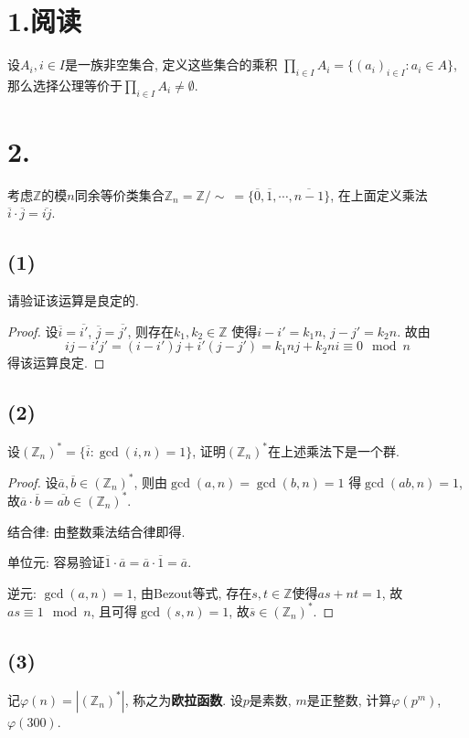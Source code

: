 \documentclass[12pt, a4paper, fontset=windows]{ctexart}
\newcommand{\Z}{\mathbb{Z}}
\newcommand{\abs}[1]{\left|{#1}\right|}
\newcommand{\cl}[1]{\overline{#1}} %
\newcommand{\yuedu}{{\normalsize 阅读}}
\begin{document}
\section*{1.\yuedu}

设$A_i,i\in I$是一族非空集合, 定义这些集合的乘积
$\prod_{i\in I}A_i=\{(a_i)_{i\in I}:a_i\in A\}$, 
那么选择公理等价于$\prod_{i\in I}A_i\ne\emptyset$. 

\section*{2.}

考虑$\Z$的模$n$同余等价类集合$\Z_n=\Z/\sim\ =\{\cl{0},\cl{1},\cdots,\cl{n-1}\}$, 
在上面定义乘法$\cl{i}\cdot\cl{j}=\cl{ij}$. 

\subsection*{(1)}

请验证该运算是良定的. 

\begin{proof}
设$\cl{i}=\cl{i'}$, $\cl{j}=\cl{j'}$, 则存在$k_1,k_2\in\Z$
使得$i-i'=k_1n$, $j-j'=k_2n$. 故由
\[ij-i'j'=(i-i')j+i'(j-j')=k_1nj+k_2ni\equiv 0\mod{n}\]
得该运算良定. 
\end{proof}

\subsection*{(2)}

设$(\Z_n)^*=\{\cl{i}:\gcd(i,n)=1\}$, 
证明$(\Z_n)^*$在上述乘法下是一个群. 

\begin{proof}
设$\cl{a},\cl{b}\in(\Z_n)^*$, 则由$\gcd(a,n)=\gcd(b,n)=1$
得$\gcd(ab,n)=1$, 故$\cl{a}\cdot\cl{b}=\cl{ab}\in(\Z_n)^*$. 

结合律: 
由整数乘法结合律即得. 

单位元: 
容易验证$\cl{1}\cdot\cl{a}=\cl{a}\cdot\cl{1}=\cl{a}$. 

逆元: 
$\gcd(a,n)=1$, 由Bezout等式, 存在$s,t\in\Z$使得$as+nt=1$, 
故$as\equiv 1\mod{n}$, 且可得$\gcd(s,n)=1$, 故$\cl{s}\in(\Z_n)^*$. 
\end{proof}

\subsection*{(3)}

记$\varphi(n)=\abs{(\Z_n)^*}$, 称之为{\bf 欧拉函数}. 
设$p$是素数, $m$是正整数, 计算$\varphi(p^m)$, $\varphi(300)$. 
\end{document}
